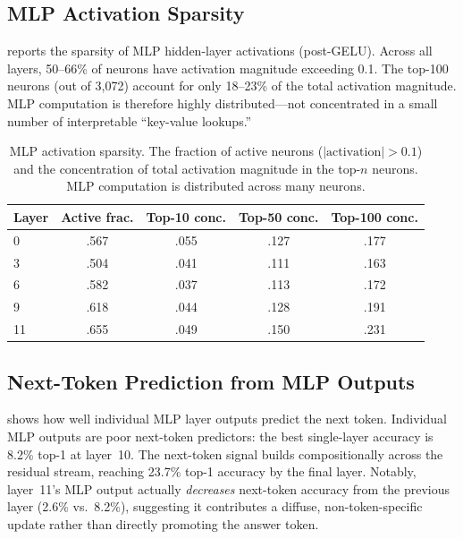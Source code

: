 \subsection{MLP Activation Sparsity}
\label{sec:res_sparsity}

 reports the sparsity of MLP hidden-layer activations (post-GELU).
Across all layers, 50--66\% of neurons have activation magnitude exceeding 0.1.
The top-100 neurons (out of 3,072) account for only 18--23\% of the total activation magnitude.
MLP computation is therefore highly distributed---not concentrated in a small number of interpretable ``key-value lookups.''

\begin{table}[t]
    \centering
    \caption{MLP activation sparsity. The fraction of active neurons ($|\text{activation}| > 0.1$) and the concentration of total activation magnitude in the top-$n$ neurons. MLP computation is distributed across many neurons.}
    \label{tab:sparsity}
    \begin{tabular}{@{}lcccc@{}}
        \toprule
        Layer & Active frac. & Top-10 conc. & Top-50 conc. & Top-100 conc. \\
        \midrule
        0 & .567 & .055 & .127 & .177 \\
        3 & .504 & .041 & .111 & .163 \\
        6 & .582 & .037 & .113 & .172 \\
        9 & .618 & .044 & .128 & .191 \\
        11 & .655 & .049 & .150 & .231 \\
        \bottomrule
    \end{tabular}
\end{table}

\subsection{Next-Token Prediction from MLP Outputs}
\label{sec:res_nexttok}

 shows how well individual MLP layer outputs predict the next token.
Individual MLP outputs are poor next-token predictors: the best single-layer accuracy is 8.2\% top-1 at layer~10.
The next-token signal builds compositionally across the residual stream, reaching 23.7\% top-1 accuracy by the final layer.
Notably, layer~11's MLP output actually \emph{decreases} next-token accuracy from the previous layer (2.6\% vs.\ 8.2\%), suggesting it contributes a diffuse, non-token-specific update rather than directly promoting the answer token.


